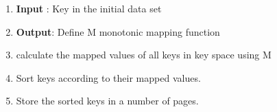 \begin{enumerate}
	\item \textbf{Input} : Key in the initial data set
    \item \textbf{Output}: Define M monotonic mapping function
    \item calculate the mapped values of all keys in key space using M
    \item Sort keys according to their mapped values. 
    \item Store the sorted keys in a number of pages.
\end{enumerate}






